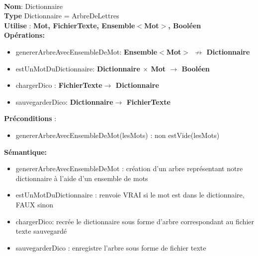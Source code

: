 \documentclass{article}
\begin{document}
    \noindent
    \\
    \textbf{Nom}: Dictionnaire\\
    \textbf{Type} Dictionnaire = ArbreDeLettres \\
    \textbf{Utilise} : \textbf{Mot, FichierTexte, Ensemble$<$Mot$>$, Booléen}\\
    \textbf{Opérations:} \begin{itemize}[label=$\ $, leftmargin=2cm, itemsep=0cm]
        \item genererArbreAvecEnsembleDeMot: \textbf{Ensemble$<$Mot$>$ $\nrightarrow $ Dictionnaire}
        \item estUnMotDuDictionnaire: \textbf{Dictionnaire $\times$ Mot $\rightarrow $ Booléen}
        \item chargerDico : \textbf{FichierTexte$ \rightarrow$ Dictionnaire}
        \item sauvegarderDico: \textbf{Dictionnaire$\rightarrow$ FichierTexte}
        
    \end{itemize}
    \textbf{Préconditions} :
    \begin{itemize}[label=$\ $, leftmargin=2cm, itemsep=0cm]
     	\item genererArbreAvecEnsembleDeMot(lesMots) : non estVide(lesMots)
    \end{itemize}

    \textbf{Sémantique: }\begin{itemize}[label=$\- $, leftmargin=2cm, itemsep=0cm]
        \item genererArbreAvecEnsembleDeMot : création d'un arbre représentant notre dictionnaire à l'aide d'un ensemble de mots
        \item estUnMotDuDictionnaire : renvoie VRAI si le mot est dans le dictionnaire, FAUX sinon
        \item chargerDico: recrée le dictionnaire sous forme d'arbre correspondant au fichier texte sauvegardé
        \item sauvegarderDico : enregistre l'arbre sous forme de fichier texte
    \end{itemize}
\end{document}
